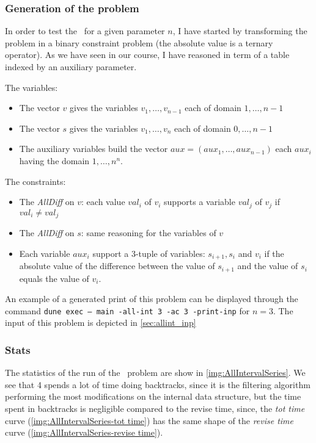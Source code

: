 \documentclass{rapport}
\begin{document}
\subsubsection{Generation of the problem}
\label{sec:allIntGen}

In order to test the \allint\ for a given parameter $n$, I have started by transforming the problem in a binary constraint problem (the absolute value is a ternary operator). As we have seen in our course, I have reasoned in term of a table indexed by an auxiliary parameter.

The variables:

\begin{itemize}
  \item The vector $v$ gives the variables $v_1, \dots, v_{n-1}$ each of domain $1, \dots, n - 1$
  \item The vector $s$ gives the variables $v_1, \dots, v_{n}$ each of domain $0, \dots, n - 1$
  \item The auxiliary variables build the vector $aux = (aux_1, \dots, aux_{n-1})$ each $aux_i$ having the domain $1, \dots, n^n$.
\end{itemize}

The constraints:
\begin{itemize}
  \item The \textit{AllDiff} on $v$: each value $val_i$ of $v_i$ supports a variable $val_j$ of $v_j$ if $val_i \neq val_j$
  \item The \textit{AllDiff} on $s$: same reasoning for the variables of $v$
  \item Each variable $aux_i$ support a $3$-tuple of variables: $s_{i+1}, s_i$ and $v_i$ if the absolute value of the difference between the value of $s_{i+1}$ and the value of $s_i$ equals the value of $v_i$.
\end{itemize}

An example of a generated print of this problem can be displayed through the command \texttt{dune exec -- main -all-int 3 -ac 3 -print-inp} for $n = 3$. The input of this problem is depicted in \cref{sec:allint_inp}


\subsubsection{Stats}


The statistics of the run of the \allint\ problem are show in \cref{img:AllIntervalSeries}. We see that \ac{4} spends a lot of time doing backtracks, since it is the filtering algorithm performing the most modifications on the internal data structure, but the time spent in backtracks is negligible compared to the revise time, since, the \textit{tot time} curve (\cref{img:AllIntervalSeries-tot time}) has the same shape of the \textit{revise time} curve (\cref{img:AllIntervalSeries-revise time}).
\end{document}
